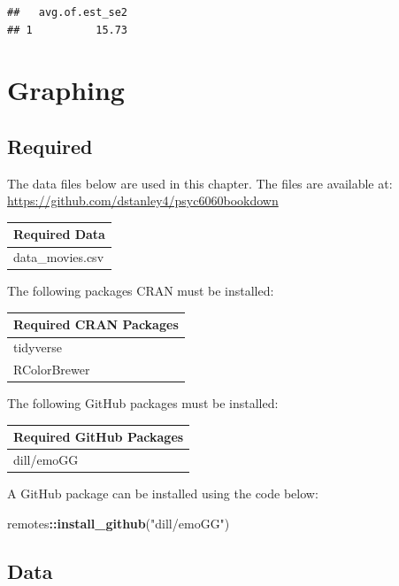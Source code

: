 \documentclass[
]{krantz}
\makeatletter
\newenvironment{Shaded}{\begin{snugshade}}{\end{snugshade}}
\newcommand{\KeywordTok}[1]{\textcolor[rgb]{0.27,0.27,0.27}{\textbf{#1}}}
\newcommand{\NormalTok}[1]{#1}
\newcommand{\OperatorTok}[1]{\textcolor[rgb]{0.43,0.43,0.43}{\textbf{#1}}}
\newcommand{\StringTok}[1]{\textcolor[rgb]{0.5,0.5,0.5}{#1}}
\newenvironment{kframe}{%
\medskip{}
\setlength{\fboxsep}{.8em}
 \def\at@end@of@kframe{}%
 \ifinner\ifhmode%
  \def\at@end@of@kframe{\end{minipage}}%
  \begin{minipage}{\columnwidth}%
 \fi\fi%
 \def\FrameCommand##1{\hskip\@totalleftmargin \hskip-\fboxsep
 \colorbox{shadecolor}{##1}\hskip-\fboxsep
     \hskip-\linewidth \hskip-\@totalleftmargin \hskip\columnwidth}%
 \MakeFramed {\advance\hsize-\width
   \@totalleftmargin\z@ \linewidth\hsize
   \@setminipage}}%
 {\par\unskip\endMakeFramed%
 \at@end@of@kframe}
\renewenvironment{Shaded}{\begin{kframe}}{\end{kframe}}
\makeatother
\begin{document}
\begin{verbatim}
##   avg.of.est_se2
## 1          15.73
\end{verbatim}

\hypertarget{graphing}{%
\chapter{Graphing}\label{graphing}}

\hypertarget{required-1}{%
\section{Required}\label{required-1}}

The data files below are used in this chapter. The files are available at: \url{https://github.com/dstanley4/psyc6060bookdown}

\begin{longtable}[]{@{}l@{}}
\toprule
Required Data\tabularnewline
\midrule
\endhead
data\_movies.csv\tabularnewline
\bottomrule
\end{longtable}

The following packages CRAN must be installed:

\begin{longtable}[]{@{}l@{}}
\toprule
Required CRAN Packages\tabularnewline
\midrule
\endhead
tidyverse\tabularnewline
RColorBrewer\tabularnewline
\bottomrule
\end{longtable}

The following GitHub packages must be installed:

\begin{longtable}[]{@{}l@{}}
\toprule
Required GitHub Packages\tabularnewline
\midrule
\endhead
dill/emoGG\tabularnewline
\bottomrule
\end{longtable}

A GitHub package can be installed using the code below:

\begin{Shaded}
\begin{Highlighting}[]
\NormalTok{remotes}\OperatorTok{::}\KeywordTok{install_github}\NormalTok{(}\StringTok{"dill/emoGG"}\NormalTok{)}
\end{Highlighting}
\end{Shaded}

\hypertarget{data}{%
\section{Data}\label{data}}
\end{document}
